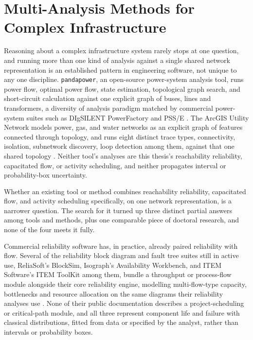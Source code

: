 \documentclass[12pt]{report}
\begin{document}
\section{Multi-Analysis Methods for Complex Infrastructure}
\label{sec:bg-frameworks}

Reasoning about a complex infrastructure system rarely stops at one question, and running more
than one kind of analysis against a single shared network representation is an established
pattern in engineering software, not unique to any one discipline. \texttt{pandapower}, an
open-source power-system analysis tool, runs power flow, optimal power flow, state estimation,
topological graph search, and short-circuit calculation against one explicit graph of buses,
lines and transformers, a diversity of analysis paradigm matched by commercial power-system
suites such as DIgSILENT PowerFactory and PSS/E \cite{thurner2018pandapower}. The {ArcGIS}
Utility Network models power, gas, and water networks as an explicit graph of features connected
through topology, and runs eight distinct trace types, connectivity, isolation, subnetwork
discovery, loop detection among them, against that one shared topology
\cite{esri_utilitynetwork}. Neither tool's analyses are this thesis's reachability reliability,
capacitated flow, or activity scheduling, and neither propagates interval or probability-box
uncertainty.

Whether an existing tool or method combines reachability reliability, capacitated flow, and
activity scheduling specifically, on one network representation, is a narrower question. The
search for it turned up three distinct partial answers among tools and methods, plus one
comparable piece of doctoral research, and none of the four meets it fully.

Commercial reliability software has, in practice, already paired reliability with flow. Several
of the reliability block diagram and fault tree suites still in active use, ReliaSoft's
BlockSim, Isograph's Availability Workbench, and ITEM Software's ITEM ToolKit among them, bundle
a throughput or process-flow module alongside their core reliability engine, modelling
multi-flow-type capacity, bottlenecks and resource allocation on the same diagrams their
reliability analyses use \cite{reliasoft2024blocksim,isograph2024availability,itemsoftware2024toolkit}.
None of their public documentation describes a project-scheduling or critical-path module, and
all three represent component life and failure with classical distributions, fitted from data or
specified by the analyst, rather than intervals or probability boxes.
\end{document}
